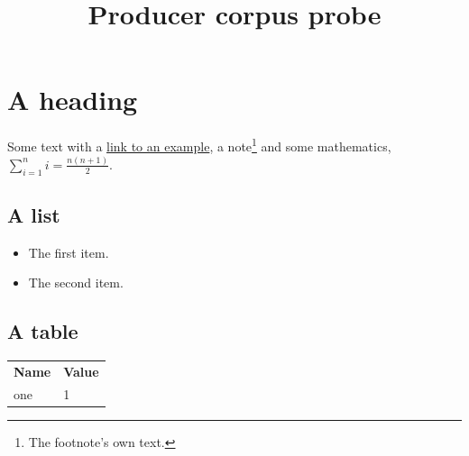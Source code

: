 \documentclass{article}
\title{Producer corpus probe}
\begin{document}
\maketitle
\section{A heading}
Some text with a \href{https://example.org/}{link to an example}, a note\footnote{The footnote's own text.} and
some mathematics, $\sum_{i=1}^{n} i = \frac{n(n+1)}{2}$.
\subsection{A list}
\begin{itemize}\item The first item.\item The second item.\end{itemize}
\subsection{A table}
\begin{tabular}{ll}\textbf{Name}&\textbf{Value}\\one&1\end{tabular}
\end{document}
